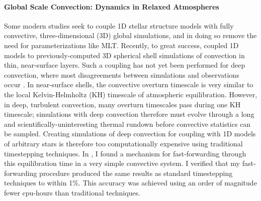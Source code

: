 \documentclass[preprint, hmargin=1in, vmargin=1in]{aastex62}
\begin{document}
\paragraph{Global Scale Convection: Dynamics in Relaxed Atmospheres}
Some modern studies seek to couple 1D stellar structure models with fully convective, three-dimensional (3D) global simulations, and in doing so remove the need for parameterizations like MLT.
Recently, to great success, \citet{jorgensen&weiss2019} coupled 1D models to previously-computed 3D spherical shell simulations of convection in thin, near-surface layers.
Such a coupling has not yet been performed for deep convection, where most disagreements between simulations and observations occur \citep[the Convective Conundrum,][]{hanasoge&all2015}.
In near-surface shells, the convective overturn timescale is very similar to the local Kelvin-Helmholtz (KH) timescale of atmospheric equilibration.
However, in deep, turbulent convection, many overturn timescales pass during one KH timescale; simulations with deep convection therefore must evolve through a long and scientifically-uninteresting thermal rundown before convective statistics can be sampled.
Creating simulations of deep convection for coupling with 1D models of arbitrary stars is therefore too computationally expensive using traditional timestepping techniques.
In \citet{anders&all2018}, I found a mechanism for fast-forwarding through this equilibration time in a very simple convective system.
I verified that my fast-forwarding procedure produced the same results as standard timestepping techniques to within 1\%.
This accuracy was achieved using an order of magnitude fewer cpu-hours than traditional techniques.
\end{document}
